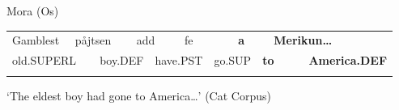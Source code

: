 \begin{listWWNumileveli}
\item 

\begin{styleExample}
\label{bkm:Ref135470190}Mora (Os)

\end{styleExample}

\end{listWWNumileveli}

\begin{listWWNumlxxxviileveli}
\item 

\end{listWWNumlxxxviileveli}

\begin{tabular}{llllllllllll}
\lsptoprule
Gamblest & \multicolumn{2}{l}{påjtsen

} & \multicolumn{2}{l}{add

} & \multicolumn{2}{l}{fe

} & \multicolumn{2}{l}{{\bfseries a}

} & \multicolumn{2}{l}{{\bfseries Merikun…}

} & \\
\multicolumn{2}{l}{old.SUPERL

} & \multicolumn{2}{l}{boy.DEF

} & \multicolumn{2}{l}{have.PST

} & \multicolumn{2}{l}{go.SUP

} & \multicolumn{2}{l}{{\bfseries to}

} & \multicolumn{2}{l}{{\bfseries America.DEF}

}\\
\lspbottomrule
\end{tabular}

\begin{styleTranslation}
‘The eldest boy had gone to America…’ (Cat Corpus)

\end{styleTranslation}

